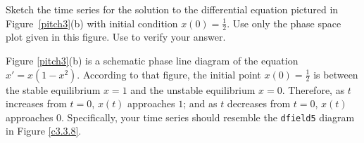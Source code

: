 \documentclass{ximera}
\begin{document}
\begin{computerExercise} \label{c3.3.8}
Sketch the time series for the solution to the differential
equation pictured in Figure~\ref{pitch3}(b) with initial condition
$x(0)=\frac{1}{2}$.  Use only the phase space plot given in this
figure.  Use {\dfield} to verify your answer.

\begin{solution}

Figure \ref{pitch3}(b) is a schematic
phase line diagram of the equation $x' = x(1 - x^2)$.  According
to that figure, the initial point $x(0) = \frac{1}{2}$ is between
the stable equilibrium $x = 1$ and the unstable equilibrium
$x = 0$.  Therefore, as $t$ increases from $t = 0$, $x(t)$
approaches $1$; and as $t$ decreases from $t = 0$, $x(t)$
approaches $0$.  Specifically, your time series should resemble
the {\tt dfield5} diagram in Figure \ref{c3.3.8}.

\begin{figure}[htb]
                       \centerline{%
                       }
\end{figure}

\end{solution}
\end{computerExercise}
\end{document}
